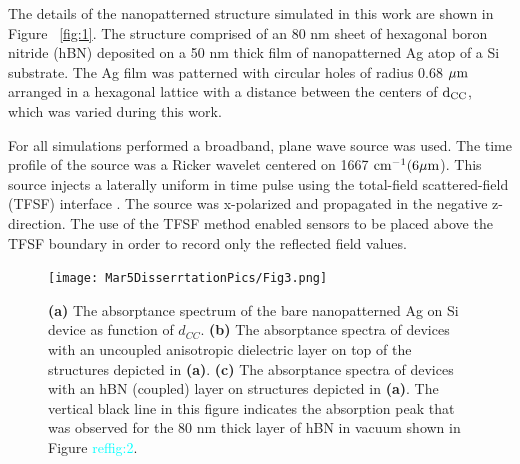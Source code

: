 \documentclass[
peprint,
amsmath,amssymb,
aip,
jap,
floatfix,
]{revtex4-2}
\begin{document}
    The details of the nanopatterned structure simulated in this work are shown in Figure ~\ref{fig:1}. The structure comprised of an 80 nm sheet of hexagonal boron nitride (hBN) deposited on a 50 nm thick film of nanopatterned Ag atop of a Si substrate. The Ag film was patterned with circular holes of radius 0.68 $\rm \mu m$ arranged in a hexagonal lattice with a distance between the centers of $\rm d_{CC}$, which was varied during this work.

    For all simulations performed a broadband, plane wave source was used. The time profile of the source was a Ricker wavelet \cite{Ricker:43} centered on 1667 $\rm cm^{-1} (6  \mu m$). This source injects a laterally uniform in time pulse using the total-field scattered-field (TFSF) interface \cite{Merewether:80}. The source was x-polarized and propagated in the negative z-direction. The use of the TFSF method enabled sensors to be placed above the TFSF boundary in order to record only the reflected field values.

      \begin{figure}[!htb]
        \centering\texttt{[image: Mar5DisserrtationPics/Fig3.png]}
        \caption{\textbf{(a)} The absorptance spectrum of the bare nanopatterned Ag on Si device as function of $d_{CC}$. \textbf{(b)} The absorptance spectra of devices with an uncoupled anisotropic dielectric layer on top of the structures depicted in \textbf{(a)}. \textbf{(c)} The absorptance spectra of devices with an hBN (coupled) layer on structures depicted in \textbf{(a)}. The vertical black line in this figure indicates the absorption peak that was observed for the 80 nm thick layer of hBN in vacuum shown in Figure \textcolor{cyan}{ref{fig:2}}.}
        \label{fig:3}
      \end{figure}
\end{document}

